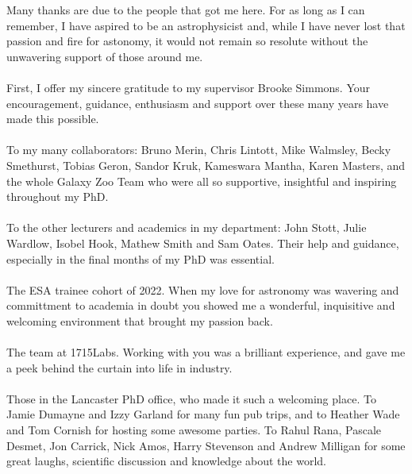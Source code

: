 

\begin{acknowledgements}      %
Many thanks are due to the people that got me here. For as long as I can remember, I have aspired to be an astrophysicist and, while I have never lost that passion and fire for astonomy, it would not remain so resolute without the unwavering support of those around me.
\\
\\
First, I offer my sincere gratitude to my supervisor Brooke Simmons. Your encouragement, guidance, enthusiasm and support over these many years have made this possible.
\\
\\
To my many collaborators: Bruno Merin, Chris Lintott, Mike Walmsley, Becky Smethurst, Tobias Geron, Sandor Kruk, Kameswara Mantha, Karen Masters, and the whole Galaxy Zoo Team who were all so supportive, insightful and inspiring throughout my PhD. 
\\
\\
To the other lecturers and academics in my department: John Stott, Julie Wardlow, Isobel Hook, Mathew Smith and Sam Oates. Their help and guidance, especially in the final months of my PhD was essential.
\\
\\
The ESA trainee cohort of 2022. When my love for astronomy was wavering and committment to academia in doubt you showed me a wonderful, inquisitive and welcoming environment that brought my passion back.
\\
\\
The team at 1715Labs. Working with you was a brilliant experience, and gave me a peek behind the curtain into life in industry.
\\
\\
Those in the Lancaster PhD office, who made it such a welcoming place. To Jamie Dumayne and Izzy Garland for many fun pub trips, and to Heather Wade and Tom Cornish for hosting some awesome parties. To Rahul Rana, Pascale Desmet, Jon Carrick, Nick Amos, Harry Stevenson and Andrew Milligan for some great laughs, scientific discussion and knowledge about the world.
\\

\end{acknowledgements}
